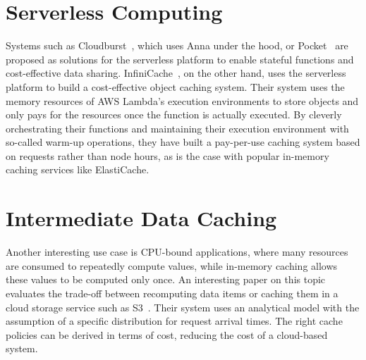 \section{Serverless Computing}
\label{sec:serverless_computing_rw}
Systems such as Cloudburst~\cite{sreekanti_cloudburst_2020}, which uses Anna under the hood, or Pocket~\cite{klimovic_pocket_nodate} are proposed as solutions for the serverless platform to enable stateful functions and cost-effective data sharing. InfiniCache~\cite{wang_infinicache_2020}, on the other hand, uses the serverless platform to build a cost-effective object caching system. Their system uses the memory resources of AWS Lambda's execution environments to store objects and only pays for the resources once the function is actually executed. By cleverly orchestrating their functions and maintaining their execution environment with so-called warm-up operations, they have built a pay-per-use caching system based on requests rather than node hours, as is the case with popular in-memory caching services like ElastiCache.

\section{Intermediate Data Caching}
\label{sec:intermediate_data_caching}
Another interesting use case is CPU-bound applications, where many resources are consumed to repeatedly compute values, while in-memory caching allows these values to be computed only once. An interesting paper on this topic evaluates the trade-off between recomputing data items or caching them in a cloud storage service such as S3~\cite{scouarnec_cache_2014}. Their system uses an analytical model with the assumption of a specific distribution for request arrival times. The right cache policies can be derived in terms of cost, reducing the cost of a cloud-based system.

